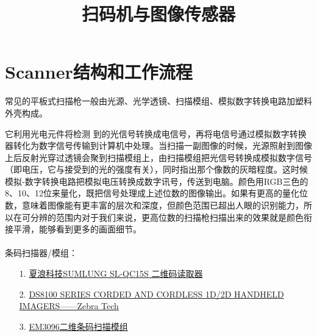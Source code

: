 \documentclass[a4paper,11pt]{article}
\title{扫码机与图像传感器}
\begin{document}
\setlength{\parindent}{2em}
   \maketitle
   \section{Scanner结构和工作流程}
常见的平板式扫描枪一般由光源、光学透镜、扫描模组、模拟数字转换电路加塑料外壳构成。
	
它利用光电元件将检测 到的光信号转换成电信号，再将电信号通过模拟数字转换器转化为数字信号传输到计算机中处理。当扫描一副图像的时候，光源照射到图像上后反射光穿过透镜会聚到扫描模组上，由扫描模组把光信号转换成模拟数字信号（即电压，它与接受到的光的强度有关），同时指出那个像数的灰暗程度。这时候模拟-数字转换电路把模拟电压转换成数字讯号，传送到电脑。颜色用RGB三色的8、10、12位来量化，既把信号处理成上述位数的图像输出。如果有更高的量化位数，意味着图像能有更丰富的层次和深度，但颜色范围已超出人眼的识别能力，所以在可分辨的范围内对于我们来说，更高位数的扫描枪扫描出来的效果就是颜色衔接平滑，能够看到更多的画面细节。
\\
\\
条码扫描器/模组：
\begin{itemize}
\item[1.] \href{http://www.sumlung.com/cn/2d-barcode-reader.html}{夏浪科技SUMLUNG SL-QC15S 二维码读取器}  
\item[2.] \href{https://www.zebra.com/us/en/products/scanners/general-purpose-scanners/handheld/ds8100-series.html}{DS8100 SERIES CORDED AND CORDLESS 1D/2D HANDHELD IMAGERS——Zebra Tech}
\item[3.] \href{http://www.rakinda.com.cn/cn/productdetail/3/76/41.html}{EM3096二维条码扫描模组}

\end{itemize}
\end{document}
